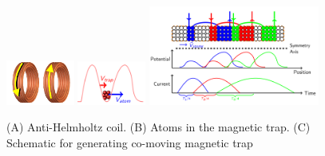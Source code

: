 \documentclass[11pt, xcolor=dvipsnames]{article}
\begin{document}
\begin{figure}[h!] \includegraphics[width = 0.2\textwidth, height= 0.15\textwidth]{antiHelmholtz} \includegraphics[width = 0.2\textwidth, height= 0.22\textwidth]{trap} \includegraphics[width = 0.5\textwidth, height=0.22\textwidth]{switching} \caption{(A) Anti-Helmholtz coil. (B) Atoms in the magnetic trap. (C) Schematic for generating co-moving magnetic trap} \label{fig1} \end{figure}
\end{document}
